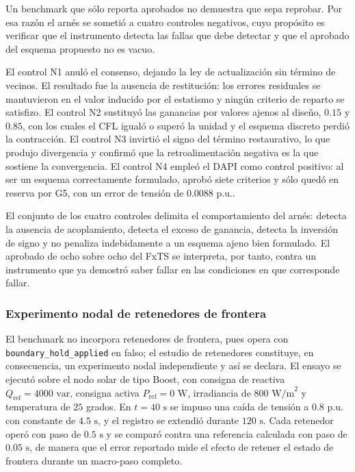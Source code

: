 Un benchmark que sólo reporta aprobados no demuestra que sepa reprobar. Por esa razón el arnés se sometió a cuatro controles negativos, cuyo propósito es verificar que el instrumento detecta las fallas que debe detectar y que el aprobado del esquema propuesto no es vacuo.

El control N1 anuló el consenso, dejando la ley de actualización sin término de vecinos. El resultado fue la ausencia de restitución: los errores residuales se mantuvieron en el valor inducido por el estatismo y ningún criterio de reparto se satisfizo. El control N2 sustituyó las ganancias por valores ajenos al diseño, $0.15$ y $0.85$, con los cuales el CFL igualó o superó la unidad y el esquema discreto perdió la contracción. El control N3 invirtió el signo del término restaurativo, lo que produjo divergencia y confirmó que la retroalimentación negativa es la que sostiene la convergencia. El control N4 empleó el DAPI como control positivo: al ser un esquema correctamente formulado, aprobó siete criterios y sólo quedó en reserva por G5, con un error de tensión de $0.0088\text{ p.u.}$.

El conjunto de los cuatro controles delimita el comportamiento del arnés: detecta la ausencia de acoplamiento, detecta el exceso de ganancia, detecta la inversión de signo y no penaliza indebidamente a un esquema ajeno bien formulado. El aprobado de ocho sobre ocho del FxTS se interpreta, por tanto, contra un instrumento que ya demostró saber fallar en las condiciones en que corresponde fallar.

\subsubsection{Experimento nodal de retenedores de frontera}

El benchmark no incorpora retenedores de frontera, pues opera con \texttt{boundary\_hold\_applied} en falso; el estudio de retenedores constituye, en consecuencia, un experimento nodal independiente y así se declara. El ensayo se ejecutó sobre el nodo solar de tipo Boost, con consigna de reactiva $Q_{\text{ref}} = 4000\text{ var}$, consigna activa $P_{\text{ref}} = 0\text{ W}$, irradiancia de $800\text{ W/m}^2$ y temperatura de $25$ grados. En $t = 40\text{ s}$ se impuso una caída de tensión a $0.8\text{ p.u.}$ con constante de $4.5\text{ s}$, y el registro se extendió durante $120\text{ s}$. Cada retenedor operó con paso de $0.5\text{ s}$ y se comparó contra una referencia calculada con paso de $0.05\text{ s}$, de manera que el error reportado mide el efecto de retener el estado de frontera durante un macro-paso completo.

